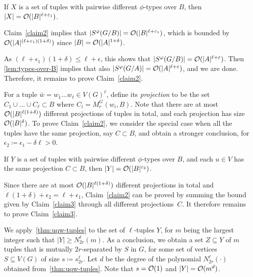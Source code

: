 \begin{claim}\label{claim2}
If $X$ is a set of tuples with pairwise different $\phi$-types over $B$, then $|X|=\mathcal{O}(|B|^{\ell+\varepsilon_1})$.
\end{claim}	

Claim~\ref{claim2} implies that $|S^\varphi(G/B)|=\mathcal{O}(|B|^{\ell+\varepsilon_1})$, 
which is bounded by $\mathcal{O}(|A|^{(\ell+\varepsilon_1)(1+\delta)})$ since $|B|=\mathcal{O}(|A|^{1+\delta})$. 

As $(\ell+\epsilon_1)(1+\delta)\le \ell+\epsilon$, this shows that $|S^\varphi(G/B)|=\mathcal{O}(|A|^{\ell+\varepsilon})$.
Then \autoref{lem:types-over-B} implies that also $|S^\varphi(G/A)|=\mathcal{O}(|A|^{\ell+\varepsilon})$, and we are done. Therefore, it remains to prove Claim~\ref{claim2}.

\medskip

For a tuple $\bar w=w_1\ldots w_\ell\in V(G)^\ell$, define its \emph{projection}
to be the set $C_1\cup\ldots\cup C_\ell\subset B$ where  
$C_i=M^G_r(w_i, B)$. Note that there are at most 
$\mathcal{O}(|B|^{\ell(1+\delta)})$ different projections of tuples in total, and each projection has size $\mathcal{O}(|B|^\delta)$.
To prove Claim~\ref{claim2}, we consider the special case when all the tuples have the same projection, say $C\subset B$, and  obtain a stronger conclusion,
for $\epsilon_2\coloneqq \epsilon_1-\delta\ell>0$.

\begin{claim}\label{claim3}
If $Y$ is a set of tuples with pairwise different $\phi$-types over $B$, and each $u\in V$ has the same projection $C\subset B$, then $|Y|=\mathcal{O}(|B|^{\varepsilon_2})$.
\end{claim}

Since there are at most $\mathcal{O}(|B|^{\ell(1+\delta)})$ different projections in total and $\ell(1+\delta)+\epsilon_2=\ell+\epsilon_1$, Claim~\ref{claim2} can be proved
by summing the bound given by Claim~\ref{claim3} through all different projections~$C$.
It therefore remains to prove Claim~\ref{claim3}.

\medskip

We apply~\autoref{thm:uqw-tuples} to the set of $\ell$-tuples $Y$, for $m$ being the largest integer such that $|Y|\ge N^{\ell}_{2r}(m)$.
  As a conclusion, we obtain a set $Z\subseteq Y$ of $m$ tuples that is mutually $2r$-separated by $S$ in $G$, for some set of vertices $S\subseteq V(G)$ of size $s\coloneqq s^{\ell}_{2r}$.
  Let $d$ be the degree of the polynomial $N^\ell_{2r}(\cdot)$ obtained from~\autoref{thm:uqw-tuples}.
  Note that $s=\mathcal{O}(1)$ and $|Y|=\mathcal{O}(m^d)$.
    
